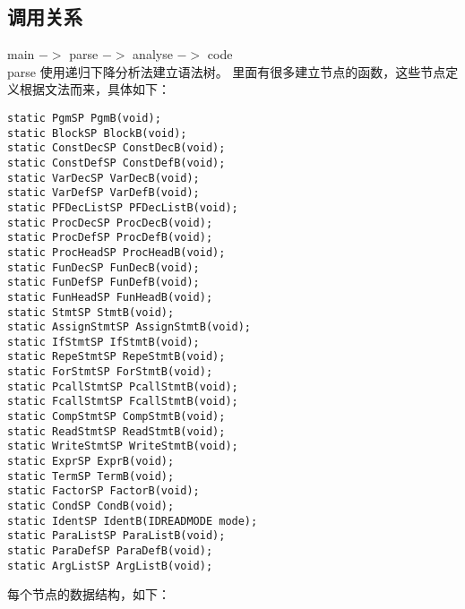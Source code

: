 \subsection{调用关系}
main $->$ parse $->$ analyse $->$ code \\
parse 使用递归下降分析法建立语法树。
里面有很多建立节点的函数，这些节点定义根据文法而来，具体如下：
\begin{verbatim}
static PgmSP PgmB(void);
static BlockSP BlockB(void);
static ConstDecSP ConstDecB(void);
static ConstDefSP ConstDefB(void);
static VarDecSP VarDecB(void);
static VarDefSP VarDefB(void);
static PFDecListSP PFDecListB(void);
static ProcDecSP ProcDecB(void);
static ProcDefSP ProcDefB(void);
static ProcHeadSP ProcHeadB(void);
static FunDecSP FunDecB(void);
static FunDefSP FunDefB(void);
static FunHeadSP FunHeadB(void);
static StmtSP StmtB(void);
static AssignStmtSP AssignStmtB(void);
static IfStmtSP IfStmtB(void);
static RepeStmtSP RepeStmtB(void);
static ForStmtSP ForStmtB(void);
static PcallStmtSP PcallStmtB(void);
static FcallStmtSP FcallStmtB(void);
static CompStmtSP CompStmtB(void);
static ReadStmtSP ReadStmtB(void);
static WriteStmtSP WriteStmtB(void);
static ExprSP ExprB(void);
static TermSP TermB(void);
static FactorSP FactorB(void);
static CondSP CondB(void);
static IdentSP IdentB(IDREADMODE mode);
static ParaListSP ParaListB(void);
static ParaDefSP ParaDefB(void);
static ArgListSP ArgListB(void);
\end{verbatim}
每个节点的数据结构，如下：

